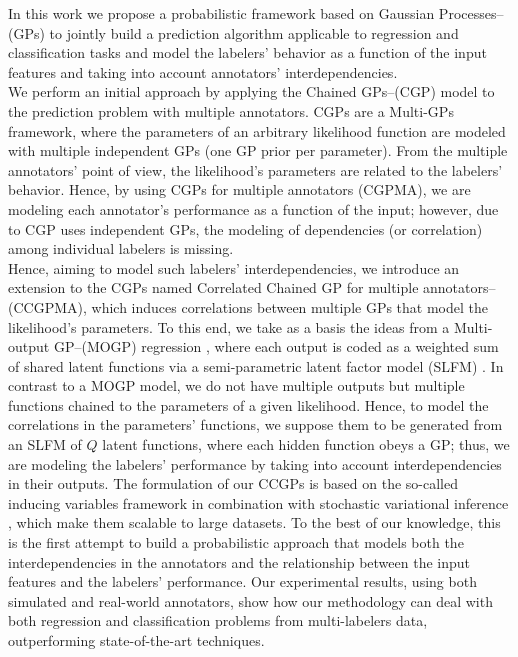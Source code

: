 \documentclass[journal]{IEEEtran}
\begin{document}
In this work we propose a probabilistic framework based on Gaussian Processes--(GPs) to jointly build a prediction algorithm applicable to regression and classification tasks and model the labelers' behavior as a function of the input features and taking into account annotators' interdependencies.\\
We perform an initial approach by applying the Chained GPs--(CGP) \cite{saul2016chained} model to the prediction problem with multiple annotators. CGPs are a Multi-GPs framework, where the parameters of an arbitrary likelihood function are modeled with multiple independent GPs (one GP prior per parameter). From the multiple annotators' point of view, the likelihood's parameters are related to the labelers' behavior. Hence, by using CGPs for multiple annotators (CGPMA), we are modeling each annotator's performance as a function of the input; however, due to CGP uses independent GPs, the modeling of dependencies (or correlation) among individual labelers is missing.\\
Hence, aiming to model such labelers' interdependencies, we introduce an extension to the CGPs named Correlated Chained GP for multiple annotators--(CCGPMA), which induces correlations between multiple GPs that model the likelihood's parameters. To this end, we take as a basis the ideas from a Multi-output GP--(MOGP) regression \cite{alvarez2012kernels}, where each output is coded as a weighted sum of shared latent functions via a semi-parametric latent factor model (SLFM) \cite{teh2005semiparametric}. In contrast to a MOGP model, we do not have multiple outputs but multiple functions chained to the parameters of a given likelihood. Hence, to model the correlations in the parameters' functions, we suppose them to be generated from an SLFM of $Q$ latent functions, where each hidden function obeys a GP; thus, we are modeling the labelers' performance by taking into account interdependencies in their outputs. The formulation of our CCGPs is based on the so-called inducing variables framework \cite{alvarez2010efficient} in combination with stochastic variational inference \cite{hoffman2013stochastic}, which make them scalable to large datasets. To the best of our knowledge, this is the first attempt to build a probabilistic approach that models both the interdependencies in the annotators and the relationship between the input features and the labelers' performance. Our experimental results, using both simulated and real-world annotators, show how our methodology can deal with both regression and classification problems from multi-labelers data, outperforming state-of-the-art techniques.
\end{document}

